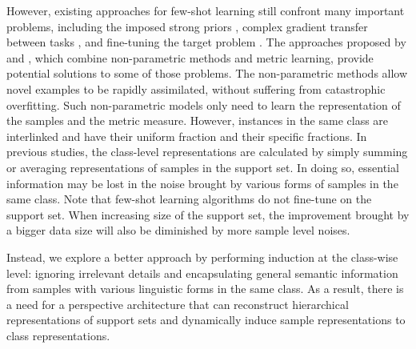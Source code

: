 \documentclass[11pt,a4paper]{article}
\begin{document}
However, existing approaches for few-shot learning still confront many important problems, including the imposed strong priors \citep{fei2006one}, complex gradient transfer between tasks \citep{munkhdalai2017meta}, and fine-tuning the target problem \citep{qi2018low}. The approaches proposed by \citet{snell2017prototypical} and \citet{sung2018learning}, which combine non-parametric methods and metric learning, provide potential solutions to some of those problems. The non-parametric methods allow novel examples to be rapidly assimilated, without suffering from catastrophic overfitting. Such non-parametric models only need to learn the representation of the samples and the metric measure. 
However, instances in the same class are interlinked and have their uniform fraction and their specific fractions. In previous studies, the class-level representations are calculated by simply summing or averaging representations of samples in the support set. In doing so, essential information may be lost in the noise brought by various forms of samples in the same class. Note that few-shot learning algorithms do not fine-tune on the support set. When increasing size of the support set, the improvement brought by a bigger data size will also be diminished by more sample level noises.


Instead, we explore a better approach by performing induction at the class-wise level: ignoring irrelevant details and encapsulating general semantic information from samples with various linguistic forms in the same class. 
As a result, there is a need for a perspective architecture that can reconstruct hierarchical representations of support sets and dynamically induce sample representations to class representations. 
\end{document}

